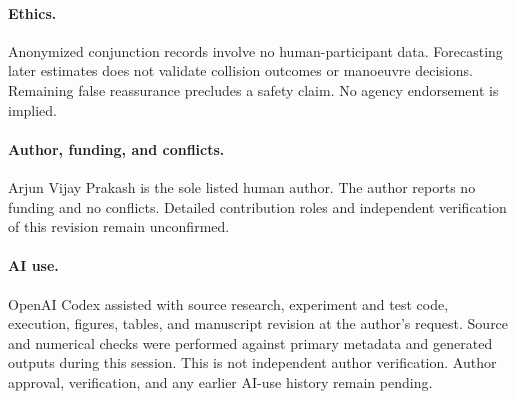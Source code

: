 \documentclass[10pt]{article}
\begin{document}
\paragraph{Ethics.} Anonymized conjunction records involve no human-participant data. Forecasting later estimates does not validate collision outcomes or manoeuvre decisions. Remaining false reassurance precludes a safety claim. No agency endorsement is implied.

\paragraph{Author, funding, and conflicts.} Arjun Vijay Prakash is the sole listed human author. The author reports no funding and no conflicts. Detailed contribution roles and independent verification of this revision remain unconfirmed.

\paragraph{AI use.} OpenAI Codex assisted with source research, experiment and test code, execution, figures, tables, and manuscript revision at the author's request. Source and numerical checks were performed against primary metadata and generated outputs during this session. This is not independent author verification. Author approval, verification, and any earlier AI-use history remain pending.
\end{document}
